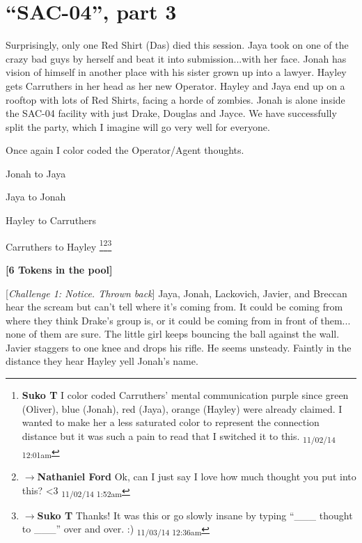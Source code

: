 \setcounter{chapter}{ 34 }
\chapter{\textbf{``SAC-04'', part 3} }









Surprisingly, only one Red Shirt (Das) died this session.  Jaya took on one of the crazy bad guys by herself and beat it into submission...with her face.  Jonah has vision of himself in another place with his sister grown up into a lawyer.  Hayley gets Carruthers in her head as her new Operator.  Hayley and Jaya end up on a rooftop with lots of Red Shirts, facing a horde of zombies.  Jonah is alone inside the SAC-04 facility with just Drake, Douglas and Jayce.  We have successfully split the party, which I imagine will go very well for everyone.



Once again I color coded the Operator/Agent thoughts.

 {\color[RGB]{74,134,232}Jonah to Jaya} 

 {\color[RGB]{255,0,0}Jaya to Jonah} 

 {\color[RGB]{230,145,56}Hayley to Carruthers} 

 {\color[RGB]{153,0,255}Carruthers to Hayley}  {\color[RGB]{153,0,255} } \footnote{\textbf{Suko T }I color coded Carruthers' mental communication purple since green (Oliver), blue (Jonah), red (Jaya), orange (Hayley) were already claimed.  I wanted to make her a less saturated color to represent the connection distance but it was such a pain to read that I switched it to this. \textsubscript{11/02/14 12:01am}}\footnote{$\rightarrow$\textbf{Nathaniel Ford }Ok, can I just say I love how much thought you put into this? \textless 3 \textsubscript{11/02/14 1:52am}}\footnote{$\rightarrow$\textbf{Suko T }Thanks!  It was this or go slowly insane by typing ``\_\_\_ thought to \_\_\_'' over and over. :) \textsubscript{11/03/14 12:36am}}






\textbf{{[}6 Tokens in the pool{]}}

{[}\textit{Challenge 1: Notice.  Thrown back}{]} Jaya, Jonah, Lackovich, Javier, and Breccan hear the scream but can't tell where it's coming from.  It could be coming from where they think Drake's group is, or it could be coming from in front of them... none of them are sure.  The little girl keeps bouncing the ball against the wall.  Javier staggers to one knee and drops his rifle.  He seems unsteady.  Faintly in the distance they hear Hayley yell Jonah's name.



